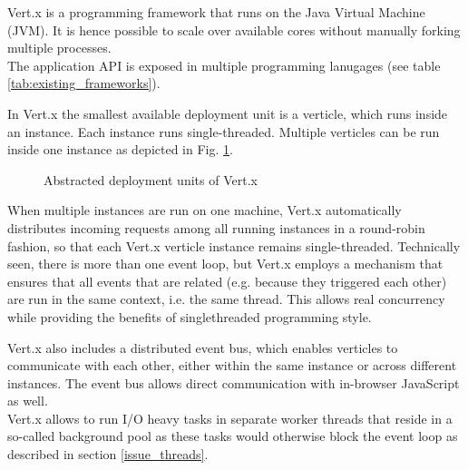 Vert.x is a programming framework that runs on the Java Virtual Machine (JVM).
It is hence possible to scale over
available cores without manually forking multiple processes.\\
The application API is exposed in multiple programming lanugages (see table
\ref{tab:existing_frameworks}).

In Vert.x the smallest available deployment unit is a verticle, which runs
inside an instance. Each instance runs single-threaded.
Multiple verticles can be run inside one instance as depicted in Fig.
\ref{fig:vertx_constructs}.

\begin{figure}[h]
	\centering
	\setlength\fboxsep{2pt}
	\caption{Abstracted deployment units of Vert.x}
	\label{fig:vertx_constructs}
\end{figure}

When multiple instances are run on one machine, Vert.x automatically distributes incoming
requests among all running instances in a round-robin fashion, so that each
Vert.x verticle instance remains single-threaded. Technically seen, there is
more than one event loop, but Vert.x employs a mechanism that ensures that all events
that are related (e.g. because they triggered each other) are run in the same context, i.e. the same thread.
This allows real concurrency while providing the benefits of singlethreaded programming style.

Vert.x also includes a distributed event bus, which enables verticles to
communicate with each other, either within the same instance or across different
instances. The event bus allows direct communication with in-browser JavaScript as well.\\
Vert.x allows to run I/O heavy tasks in separate worker threads that reside in a
so-called background pool as these tasks would otherwise block the event loop as
described in section \ref{issue_threads}.

